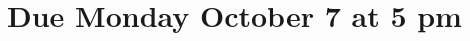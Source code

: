 \documentclass[11pt,fleqn]{article}
\begin{document}
\maketitle
\section*{Due Monday October 7 at 5 pm}










\end{document}
